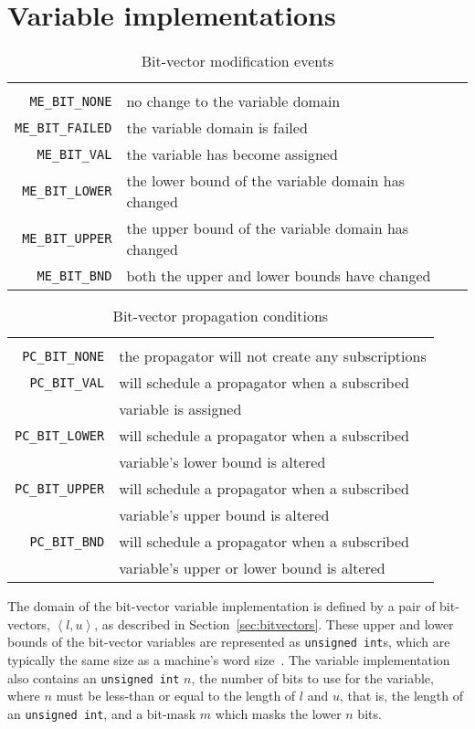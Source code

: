 \documentclass[a4paper,10pt,twoside,openright]{book}
\newcommand{\bh}[1]{\text{\fontfamily{\sfdefault}\selectfont\textbf{#1}}}
\newcommand{\tuple}[1]{\left\langle #1\right\rangle}
\newcommand*\cd[1]{\texttt{#1}}
\begin{document}
\section{Variable implementations}
\begin{table}[t]
    \small
    \begin{tabularx}{\linewidth}{ r X }
        \bh{modification event} & \bh{description} \\
        \cd{ME_BIT_NONE}	&	no change to the variable domain\\
        \cd{ME_BIT_FAILED}	&	the variable domain is failed\\
        \cd{ME_BIT_VAL}	&	the variable has become assigned\\
        \cd{ME_BIT_LOWER}	&	the lower bound of the variable domain has changed\\
        \cd{ME_BIT_UPPER}	&	the upper bound of the variable domain has changed\\
        \cd{ME_BIT_BND}	&	both the upper and lower bounds have changed\\
    \end{tabularx}
    \caption{Bit-vector modification events}
    \label{tab:me}
\end{table}
\begin{table}[t]
    \small
    \begin{tabularx}{\linewidth}{ r X }
        \bh{propagation condition} & \bh{description} \\
        \cd{PC_BIT_NONE}	&	the propagator will not create any subscriptions\\
        \cd{PC_BIT_VAL}	&	will schedule a propagator when a subscribed \\
                        &   variable is assigned\\
        \cd{PC_BIT_LOWER}	&	will schedule a propagator when a subscribed \\ 
                            &   variable's lower bound is altered\\
        \cd{PC_BIT_UPPER}	&	will schedule a propagator when a subscribed \\
                            &   variable's upper bound is altered\\
        \cd{PC_BIT_BND}	&	will schedule a propagator when a subscribed \\
                        &   variable's upper or lower bound is altered\\
    \end{tabularx}
    \caption{Bit-vector propagation conditions}
    \label{tab:pc}
\end{table}
The domain of the bit-vector variable implementation is defined by a pair of bit-vectors, $\tuple{l,u}$, as described in Section~\ref{sec:bitvectors}. These upper and lower bounds of the bit-vector variables are represented as \cd{unsigned int}s, which are typically the same size as a machine's word size~\cite{nyhoff2012programming}. 
The variable implementation also contains an \cd{unsigned int} $n$, the number of bits to use for the variable, 
where $n$ must be less-than or equal to the length of $l$ and $u$, that is, the length of an \cd{unsigned int},
and a bit-mask $m$ which masks the lower $n$ bits.
\end{document}
